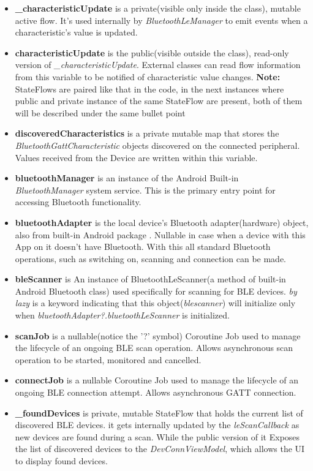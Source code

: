 \begin{itemize}
	\item \textbf{\_characteristicUpdate} is a private(visible only inside the class), mutable active flow. It's used internally by \textit{BluetoothLeManager} to emit events when a characteristic's value is updated.
	\item \textbf{characteristicUpdate} is the public(visible outside the class), read-only version of \textit{\_characteristicUpdate}. External classes can read flow information from this variable to be notified of characteristic value changes. \textbf{Note:} StateFlows are paired like that in the code, in the next instances where public and private instance of the same StateFlow are present, both of them will be described under the same bullet point
	\item \textbf{discoveredCharacteristics} is a private mutable map that stores the \textit{BluetoothGattCharacteristic} objects discovered on the connected peripheral. Values received from the Device are written within this variable.
	\item \textbf{bluetoothManager} is an instance of the Android Built-in \textit{BluetoothManager} system service\cite{android_bluetooth}. This is the primary entry point for accessing Bluetooth functionality.
	\item \textbf{bluetoothAdapter} is the local device's Bluetooth adapter(hardware) object, also from built-in Android package \cite{android_bluetooth}. Nullable in case when a device with this App on it doesn't have Bluetooth. With this all standard Bluetooth operations, such as switching on, scanning and  connection can be made.
	\item \textbf{bleScanner} is An instance of BluetoothLeScanner(a method of built-in Android Bluetooth class) used specifically for scanning for \ac{BLE} devices. \textit{by lazy} is a keyword indicating that this object(\textit{blescanner}) will initialize only when \textit{bluetoothAdapter?.bluetoothLeScanner} is initialized.
	\item \textbf{scanJob} is a nullable(notice the '?' symbol) Coroutine Job used to manage the lifecycle of an ongoing BLE scan operation. Allows asynchronous scan operation to be started, monitored and cancelled.
	\item \textbf{connectJob} is a nullable Coroutine Job used to manage the lifecycle of an ongoing \ac{BLE} connection attempt. Allows asynchronous \ac{GATT} connection.
	\item \textbf{\_foundDevices} is private, mutable StateFlow that holds the current list of discovered \ac{BLE} devices. it gets internally updated by the \textit{leScanCallback} as new devices are found during a scan. While the public version of it Exposes the list of discovered devices to the \textit{DevConnViewModel}, which allows the UI to display found devices.

\end{itemize}
